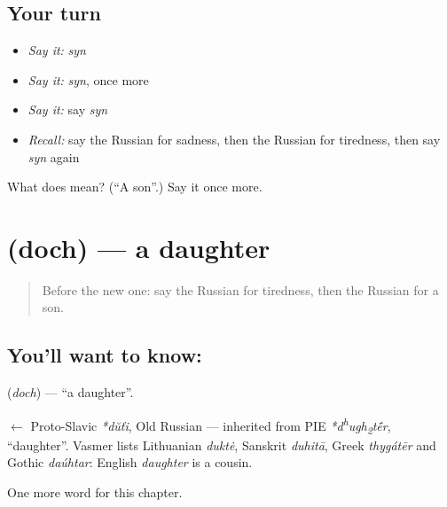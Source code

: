 \subsection*{Your turn}
\begin{itemize}
\raggedright
  \item \emph{Say it:} \emph{syn}
  \item \emph{Say it:} \emph{syn}, once more
  \item \emph{Say it:} say \emph{syn}
  \item \emph{Recall:} say the Russian for sadness, then the Russian for tiredness, then say \emph{syn} again
\end{itemize}

\begin{tcolorbox}[breakable,colback=teal!4,colframe=teal!35!black,title={Before you move on}]
What does  mean? (\textquotedblleft{}A son\textquotedblright{}.) Say it once more.
\end{tcolorbox}
\section[\texorpdfstring{\ru{дочь} (doch)}{дочь (doch)}]{ (doch) — a daughter}

\label{lesson:RU-C35-daughter}



\begin{quote}
Before the new one: say the Russian for tiredness, then the Russian for a son.
\end{quote}

\subsection*{You'll want to know: }
\textbf{} (\emph{doch}) — \textquotedblleft{}a daughter\textquotedblright{}.

\begin{cousinweb}
\textbf{} $\leftarrow$ Proto-Slavic \emph{*dŭťi}, Old Russian \emph{} — inherited from PIE \emph{*d\textsuperscript{h}ugh\textsubscript{2}t\'{\={e}}r}, \textquotedblleft{}daughter\textquotedblright{}. Vasmer lists Lithuanian \emph{duktė}, Sanskrit \emph{duhitā}, Greek \emph{thygátēr} and Gothic \emph{daúhtar}: English \emph{daughter} is a cousin.
\end{cousinweb}

\begin{grammarlens}[title={What you've built}]
One more word for this chapter.
\end{grammarlens}

